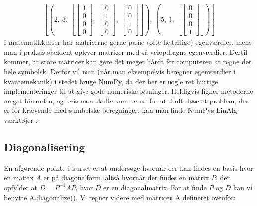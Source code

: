 \documentclass[letterpaper,10pt,english]{jupyterBook}
\begin{document}
\begin{sphinxVerbatim}[commandchars=\\\{\}]
\end{sphinxVerbatim}
\begin{equation*}
\begin{split}\displaystyle \left[ \left( 2, \  3, \  \left[ \left[\begin{matrix}1\\0\\0\\0\end{matrix}\right], \  \left[\begin{matrix}0\\1\\0\\0\end{matrix}\right], \  \left[\begin{matrix}0\\0\\1\\0\end{matrix}\right]\right]\right), \  \left( 5, \  1, \  \left[ \left[\begin{matrix}0\\0\\0\\1\end{matrix}\right]\right]\right)\right]\end{split}
\end{equation*}
I matematikkurser har matricerne gerne pæne (ofte heltallige) egenværdier, mens man i praksis sjældent oplever matricer med så velopdragne egenværdier. Dertil kommer, at store matricer kan gøre det meget hårdt for computeren at regne det hele symbolsk. Derfor vil man (når man eksempelvis beregner egenværdier i kvantemekanik) i stedet bruge NumPy, da der her er nogle ret hurtige implementeringer til at give gode numeriske løsninger. Heldigvis ligner metoderne meget hinanden, og hvis man skulle komme ud for at skulle løse et problem, der er for krævende med sumbolske beregninger, kan man finde NumPys LinAlg værktøjer .


\subsection{Diagonalisering}
\label{\detokenize{notebooks/sympy/Notebook_Linalg_2-5_Eigen:diagonalisering}}
En afgørende pointe i kurset er at undersøge hvornår der kan findes en basis hvor en matrix \(A\) er på diagonalform, altså hvornår der findes en matrix \(P\), der opfylder at \(D = P^{-1}AP\), hvor \(D\) er en diagonalmatrix. For at finde \(P\) og \(D\) kan vi benytte A.diagonalize(). Vi regner videre med matricen A defineret ovenfor:
\end{document}
